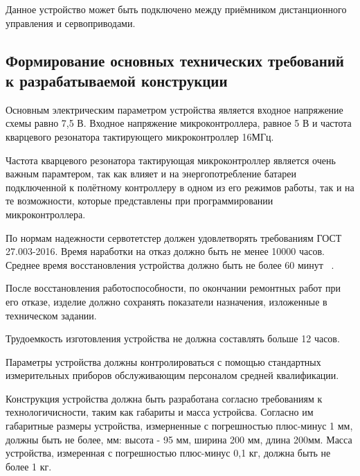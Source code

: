 Данное устройство может быть подключено между приёмником
дистанционного управления и сервоприводами.

\subsection{Формирование основных технических требований
  к разрабатываемой конструкции}

Основным электрическим параметром устройства является входное
напряжение схемы равно 7,5 В. Входное напряжение микроконтроллера,
равное 5 В и частота  кварцевого резонатора
тактирующего микроконтроллер 16МГц.

Частота кварцевого резонатора тактирующая микроконтроллер является
очень важным парамтером, так как влияет и на энергопотребление батареи
подключенной к полётному контроллеру в одном из его режимов работы,
так и на те возможности, которые представлены при программировании
микроконтроллера.

По нормам надежности сервотетстер должен удовлетворять требованиям
ГОСТ 27.003-2016. Время наработки на отказ должно быть не менее 10000
часов. Среднее время восстановления устройства должно быть не более 60
минут ~\cite{GOST-27.003-2016}.

После восстановления работоспособности, по окончании ремонтных работ
при его отказе, изделие должно сохранять показатели назначения,
изложенные в техническом задании.

Трудоемкость изготовления устройства не должна
составлять больше 12 часов.

Параметры устройства должны контролироваться с помощью стандартных
измерительных приборов обслуживающим персоналом средней квалификации.

Конструкция устройства должна быть разработана согласно требованиям к
технологичисности, таким как габариты и масса устройсва.  Согласно им
габаритные размеры устройства, измерненные с погрешностью плюс-минус 1
мм, должны быть не более, мм: высота - 95 мм, ширина 200 мм, длина
200мм. Масса устройства, измеренная с погрешностью плюс-минус 0,1 кг,
должна быть не более 1 кг.

\newpage
